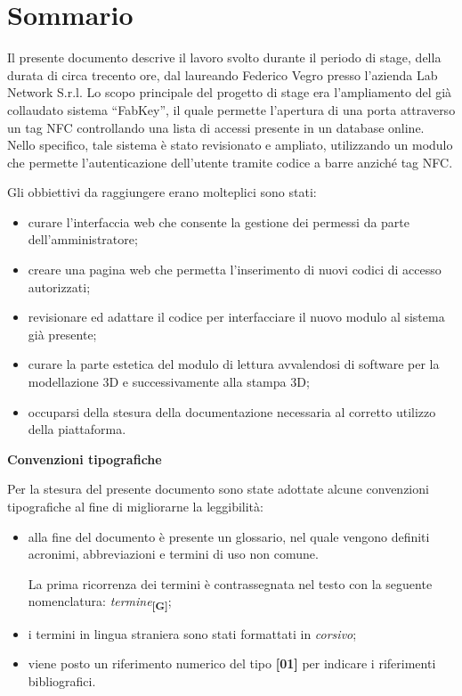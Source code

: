 
\cleardoublepage
{}
{}
\begingroup
\let\clearpage\relax
\let\cleardoublepage\relax
\let\cleardoublepage\relax

\chapter*{Sommario}

Il presente documento descrive il lavoro svolto durante il periodo di stage, della durata di circa trecento ore, dal laureando Federico Vegro presso l'azienda Lab Network S.r.l.
Lo scopo principale del progetto di stage era l'ampliamento del già collaudato sistema ``FabKey'', il quale permette l'apertura di una porta attraverso un tag NFC controllando una lista di accessi presente in un database online. Nello specifico, tale sistema è stato revisionato e ampliato, utilizzando un modulo che permette l'autenticazione dell'utente tramite codice a barre anziché tag NFC.

Gli obbiettivi da raggiungere erano molteplici sono stati:
\begin{itemize}
\item curare l'interfaccia web che consente la gestione dei permessi da parte dell'amministratore;
\item creare una pagina web che permetta l'inserimento di nuovi codici di accesso autorizzati;
\item revisionare ed adattare il codice per interfacciare il nuovo modulo al sistema già presente;
\item curare la parte estetica del modulo di lettura avvalendosi di software per la modellazione 3D e successivamente alla stampa 3D;
\item occuparsi della stesura della documentazione necessaria al corretto utilizzo della piattaforma.
\end{itemize}

\bigskip

\textbf{Convenzioni tipografiche}

\bigskip

Per la stesura del presente documento sono state adottate alcune convenzioni tipografiche al fine di migliorarne la leggibilità:
\begin{itemize}
\item alla fine del documento è presente un glossario, nel quale vengono definiti acronimi, abbreviazioni e termini di uso non comune. 

La prima ricorrenza dei termini è contrassegnata nel testo con la seguente nomenclatura: \textit{termine}\textbf{\textsubscript{[G]}};
\item i termini in lingua straniera sono stati formattati in \textit{corsivo};
\item viene posto un riferimento numerico del tipo \textbf{[01]} per indicare i riferimenti bibliografici.
\end{itemize}

